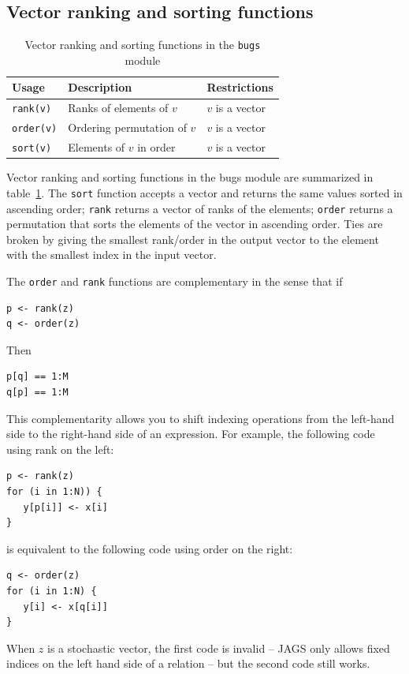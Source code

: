 \documentclass[11pt, a4paper, titlepage]{report}
\begin{document}
\subsection{Vector ranking and sorting functions}

\begin{table}
\begin{center}
\begin{tabular}{lll}
\hline
Usage & Description & Restrictions \\
\hline
\verb+rank(v)+ & Ranks of elements of $v$ & $v$ is a vector   \\
\verb+order(v)+ & Ordering permutation of $v$ & $v$ is a vector \\
\verb+sort(v)+ & Elements of $v$ in order & $v$ is a vector \\
\hline
\end{tabular}
\caption{Vector ranking and sorting functions in the \texttt{bugs}
  module \label{table:bugs:ranking}}
\end{center}
\end{table}

Vector ranking and sorting functions in the bugs module are summarized
in table~\ref{table:bugs:ranking}. The \texttt{sort} function accepts
a vector and returns the same values sorted in ascending order;
\texttt{rank} returns a vector of ranks of the elements;
\texttt{order} returns a permutation that sorts the elements of the
vector in ascending order.  Ties are broken by giving the smallest
rank/order in the output vector to the element with the smallest index
in the input vector.

The \texttt{order} and \texttt{rank} functions are complementary
in the sense that if
\begin{verbatim}
p <- rank(z)
q <- order(z)
\end{verbatim}
Then
\begin{verbatim}
p[q] == 1:M
q[p] == 1:M
\end{verbatim}
This complementarity allows you to shift indexing operations from the
left-hand side to the right-hand side of an expression. For example,
the following code using rank on the left:
\begin{verbatim}
p <- rank(z)
for (i in 1:N)) {
   y[p[i]] <- x[i]
}
\end{verbatim}
is equivalent to the following code using order on the right:
\begin{verbatim}
q <- order(z)
for (i in 1:N) {
   y[i] <- x[q[i]]
}
\end{verbatim}
When $z$ is a stochastic vector, the first code is invalid -- JAGS
only allows fixed indices on the left hand side of a relation -- but
the second code still works.
\end{document}
